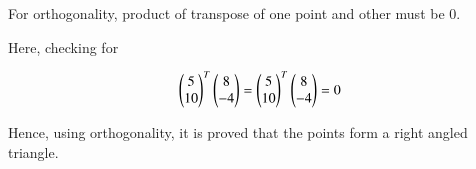 \documentclass[journal,12pt,twocolumn]{IEEEtran}
\begin{document}



For orthogonality, product of transpose of one point and other must be 0. 

Here, checking for 


\begin{align}
    \begin{pmatrix}
5\\
10 
\end{pmatrix}^T\begin{pmatrix} 8\\
-4
\end{pmatrix} =  \begin{pmatrix}
5\\
10
\end{pmatrix}^T \begin{pmatrix}
8 \\ -4
\end{pmatrix}=0
\end{align}

Hence, using orthogonality, it is proved that the points form a right angled triangle. 
\end{document}
